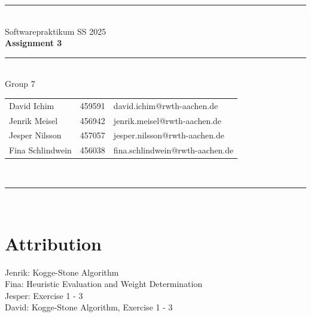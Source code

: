 \documentclass[a4paper,12pt]{article}
\begin{document}
\begin{center}
	\rule{\textwidth}{0.1pt}\\[1cm]
	
	\Large Softwarepraktikum SS 2025\\\bf Assignment 3
\end{center}

\begin{center}
	\rule{\textwidth}{0.1pt}\\[0.5cm]

	{\Large Group 7\\[5mm]}
	\begin{tabular}{lll}
		David Ichim & 459591 & david.ichim@rwth-aachen.de \\
		Jenrik Meisel & 456942 & jenrik.meisel@rwth-aachen.de \\
		Jesper Nilsson & 457057 & jesper.nilsson@rwth-aachen.de \\
		Fina Schlindwein & 456038 & fina.schlindwein@rwth-aachen.de \\
	\end{tabular}\\[0.5cm]

	\rule{\textwidth}{0.1pt}\\[1cm]
\end{center}







\section{Attribution}
Jenrik: Kogge-Stone Algorithm\\
Fina: Heuristic Evaluation and Weight Determination\\
Jesper: Exercise 1 - 3\\
David: Kogge-Stone Algorithm, Exercise 1 - 3
\end{document}
